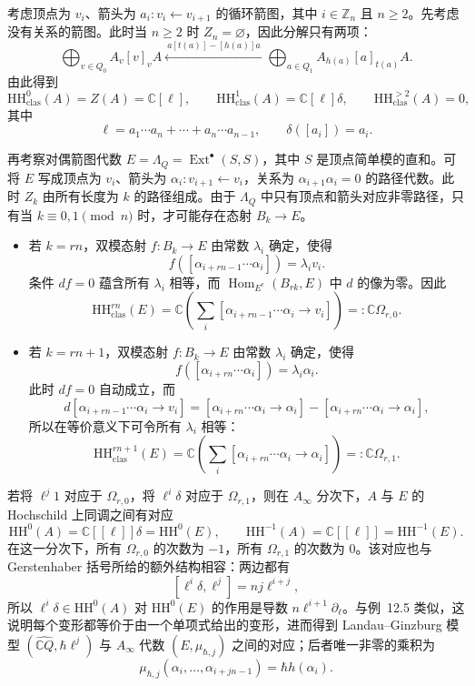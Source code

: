 \begin{example}
考虑顶点为 $v_i$、箭头为 $a_i:v_i\leftarrow v_{i+1}$ 的循环箭图，其中 $i\in\mathbb Z_n$ 且 $n\geq2$。先考虑没有关系的箭图。此时当 $n\geq2$ 时 $Z_n=\varnothing$，因此分解只有两项：
\[
  \bigoplus_{v\in Q_0}A_v[v]_vA\xleftarrow{\ a[t(a)]-[h(a)]a\ }\bigoplus_{a\in Q_1}A_{h(a)}[a]_{t(a)}A.
\]
由此得到
\[
  \mathrm{HH}^0_{\mathrm{clas}}(A)=Z(A)=\mathbb C[\ell],\qquad
  \mathrm{HH}^1_{\mathrm{clas}}(A)=\mathbb C[\ell]\delta,\qquad
  \mathrm{HH}^{>2}_{\mathrm{clas}}(A)=0,
\]
其中
\[
  \ell=a_1\cdots a_n+\cdots+a_n\cdots a_{n-1},\qquad \delta([a_i])=a_i.
\]

再考察对偶箭图代数 $E=\Lambda_Q=\operatorname{Ext}^{\bullet}(S,S)$，其中 $S$ 是顶点简单模的直和。可将 $E$ 写成顶点为 $v_i$、箭头为 $\alpha_i:v_{i+1}\leftarrow v_i$，关系为 $\alpha_{i+1}\alpha_i=0$ 的路径代数。此时 $Z_k$ 由所有长度为 $k$ 的路径组成。由于 $\Lambda_Q$ 中只有顶点和箭头对应非零路径，只有当 $k\equiv0,1\pmod n$ 时，才可能存在态射 $B_k\to E$。

\begin{itemize}
  \item 若 $k=rn$，双模态射 $f:B_k\to E$ 由常数 $\lambda_i$ 确定，使得
  \[
    f([\alpha_{i+rn-1}\cdots\alpha_i])=\lambda_i v_i.
  \]
  条件 $df=0$ 蕴含所有 $\lambda_i$ 相等，而 $\operatorname{Hom}_{E^e}(B_{rk},E)$ 中 $d$ 的像为零。因此
  \[
    \mathrm{HH}^{rn}_{\mathrm{clas}}(E)
    =\mathbb C\left(\sum_i[\alpha_{i+rn-1}\cdots\alpha_i\to v_i]\right)=:\mathbb C\Omega_{r,0}.
  \]
  \item 若 $k=rn+1$，双模态射 $f:B_k\to E$ 由常数 $\lambda_i$ 确定，使得
  \[
    f([\alpha_{i+rn}\cdots\alpha_i])=\lambda_i\alpha_i.
  \]
  此时 $df=0$ 自动成立，而
  \[
    d[\alpha_{i+rn-1}\cdots\alpha_i\to v_i]
    =[\alpha_{i+rn}\cdots\alpha_i\to\alpha_i]
    -[\alpha_{i+rn}\cdots\alpha_i\to\alpha_i],
  \]
  所以在等价意义下可令所有 $\lambda_i$ 相等：
  \[
    \mathrm{HH}^{rn+1}_{\mathrm{clas}}(E)
    =\mathbb C\left(\sum_i[\alpha_{i+rn}\cdots\alpha_i\to\alpha_i]\right)=:\mathbb C\Omega_{r,1}.
  \]
\end{itemize}
若将 $\ell^j1$ 对应于 $\Omega_{r,0}$，将 $\ell^i\delta$ 对应于 $\Omega_{r,1}$，则在 $A_\infty$ 分次下，$A$ 与 $E$ 的 Hochschild 上同调之间有对应
\[
  \mathrm{HH}^{0}(A)=\mathbb C[[\ell]]\delta=\mathrm{HH}^{0}(E),\qquad
  \mathrm{HH}^{-1}(A)=\mathbb C[[\ell]]=\mathrm{HH}^{-1}(E).
\]
在这一分次下，所有 $\Omega_{r,0}$ 的次数为 $-1$，所有 $\Omega_{r,1}$ 的次数为 $0$。该对应也与 Gerstenhaber 括号所给的额外结构相容：两边都有
\[
  [\ell^i\delta,\ell^j]=n j\ell^{i+j},
\]
所以 $\ell^i\delta\in\mathrm{HH}^{0}(A)$ 对 $\mathrm{HH}^{0}(E)$ 的作用是导数 $n\ell^{i+1}\partial_\ell$。与例~12.5 类似，这说明每个变形都等价于由一个单项式给出的变形，进而得到 Landau--Ginzburg 模型 $(\widehat{\mathbb C Q},\hbar\ell^j)$ 与 $A_\infty$ 代数 $(E,\mu_{\hbar,j})$ 之间的对应；后者唯一非零的乘积为
\[
  \mu_{\hbar,j}(\alpha_i,\ldots,\alpha_{i+jn-1})=\hbar h(\alpha_i).
\]


\end{example}

